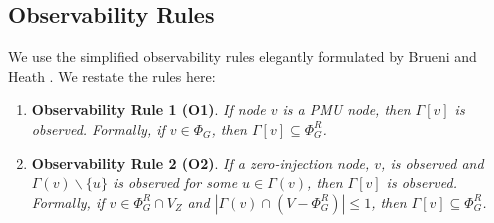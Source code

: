 \begin{comment}
\begin{table}[t]
\begin{center}
\begin{tabular}{l l} 
\hline \hline
   	{\bf Notation} & {\bf Meaning} \\
		  \hline 
		  	$G$ &  undirected graph $(V,E)$ where each $v \in V$ is a bus and each \\
				&  $(u,v) \in E$ is a transmission line connecting $u$ and $v$\\
			$\Gamma(v)$ & $\{u \in V$ $|$ $(u,v) \in E \}$ \\ 
			$\Gamma[v]$ & $\Gamma(v) \cup \{v\}$ \\
 		 	$n$ & $|V|$ \\
			$\Phi$ & a subset of $V$ in which PMUs are placed such that all \\ 
				   & $v \in V$ and all $(u,v) \in E$ observed  \\
			$\Phi^R$ & set of observed nodes \\
			$\Phi^-$ & set of observed edges \\
			\hline \hline
	\end{tabular}
	\end{center}
\caption{Notation Table}
\label{tab:notation}
\end{table}
\end{comment}

\subsection{Observability Rules}
\label{subsec:observe}

We use the simplified observability rules elegantly formulated by Brueni and Heath \cite{Brueni05}.  We restate the rules here:  %
\begin{enumerate}
	
	\item {\bf Observability Rule 1 (O1)}.  {\it If node $v$ is a PMU node, then $\Gamma[v]$ is observed. Formally, if $v \in \Phi_G$, then $\Gamma[v] \subseteq \Phi^R_G$. }

	\item {\bf Observability Rule 2 (O2)}. {\it If a zero-injection node, $v$, is observed and  $\Gamma(v)\backslash\{u\}$ is observed for some $u\in\Gamma(v)$, then  $\Gamma[v]$ is observed.
	Formally, if $v \in \Phi^R_G \cap V_Z$ and $|\Gamma(v) \cap (V - \Phi^R_G)| \leq 1$, then $\Gamma[v] \subseteq \Phi^R_G$. }

\end{enumerate}

